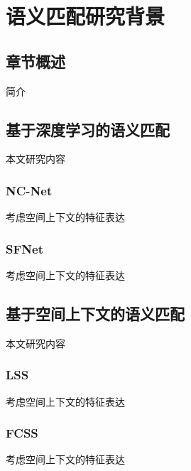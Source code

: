 \chapter{语义匹配研究背景}

\section{章节概述}
简介

\section{基于深度学习的语义匹配}
本文研究内容

\subsection{NC-Net}
考虑空间上下文的特征表达

\subsection{SFNet}
考虑空间上下文的特征表达

\section{基于空间上下文的语义匹配}
本文研究内容

\subsection{LSS}
考虑空间上下文的特征表达

\subsection{FCSS}
考虑空间上下文的特征表达


